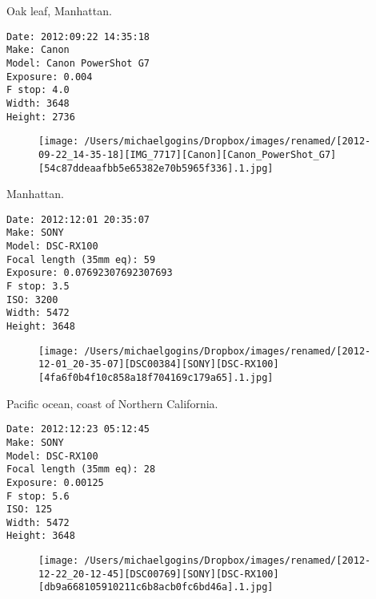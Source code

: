 \documentclass[11pt,letter,DIV=14,paper=landscape]{scrbook}
\begin{document}
\clearpage
\noindent Oak leaf, Manhattan.
\noindent
\begin{lstlisting}
Date: 2012:09:22 14:35:18
Make: Canon
Model: Canon PowerShot G7
Exposure: 0.004
F stop: 4.0
Width: 3648
Height: 2736
\end{lstlisting}
\clearpage

\begin{figure}
\texttt{[image: /Users/michaelgogins/Dropbox/images/renamed/[2012-09-22\_14-35-18][IMG\_7717][Canon][Canon\_PowerShot\_G7][54c87ddeaafbb5e65382e70b5965f336].1.jpg]}
\end{figure}
    
\clearpage
\noindent Manhattan.
\noindent
\begin{lstlisting}
Date: 2012:12:01 20:35:07
Make: SONY
Model: DSC-RX100
Focal length (35mm eq): 59
Exposure: 0.07692307692307693
F stop: 3.5
ISO: 3200
Width: 5472
Height: 3648
\end{lstlisting}
\clearpage

\begin{figure}
\texttt{[image: /Users/michaelgogins/Dropbox/images/renamed/[2012-12-01\_20-35-07][DSC00384][SONY][DSC-RX100][4fa6f0b4f10c858a18f704169c179a65].1.jpg]}
\end{figure}
    
\clearpage
\noindent Pacific ocean, coast of Northern California.
\noindent
\begin{lstlisting}
Date: 2012:12:23 05:12:45
Make: SONY
Model: DSC-RX100
Focal length (35mm eq): 28
Exposure: 0.00125
F stop: 5.6
ISO: 125
Width: 5472
Height: 3648
\end{lstlisting}
\clearpage

\begin{figure}
\texttt{[image: /Users/michaelgogins/Dropbox/images/renamed/[2012-12-22\_20-12-45][DSC00769][SONY][DSC-RX100][db9a668105910211c6b8acb0fc6bd46a].1.jpg]}
\end{figure}
    
\end{document}
